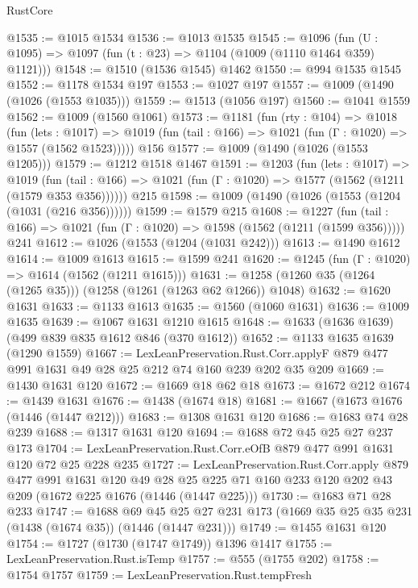 \begin{lexlean}{RustCore}
\begin{coremodule}
@1535 := @1015 @1534
@1536 := @1013 @1535
@1545 := @1096 (fun (U : @1095) => @1097 (fun (t : @23) => @1104 (@1009 (@1110 @1464 @359) @1121)))
@1548 := @1510 (@1536 @1545) @1462
@1550 := @994 @1535 @1545
@1552 := @1178 @1534 @197
@1553 := @1027 @197
@1557 := @1009 (@1490 (@1026 (@1553 @1035)))
@1559 := @1513 (@1056 @197)
@1560 := @1041 @1559
@1562 := @1009 (@1560 @1061)
@1573 := @1181
    (fun (rty : @104) =>
    @1018
      (fun (lets : @1017) =>
      @1019 (fun (tail : @166) => @1021 (fun (Γ : @1020) => @1557 (@1562 @1523)))))
    @156
@1577 := @1009 (@1490 (@1026 (@1553 @1205)))
@1579 := @1212 @1518 @1467
@1591 := @1203
    (fun (lets : @1017) =>
    @1019 (fun (tail : @166) => @1021 (fun (Γ : @1020) => @1577 (@1562 (@1211 (@1579 @353 @356))))))
    @215
@1598 := @1009 (@1490 (@1026 (@1553 (@1204 (@1031 (@216 @356))))))
@1599 := @1579 @215
@1608 := @1227
    (fun (tail : @166) => @1021 (fun (Γ : @1020) => @1598 (@1562 (@1211 (@1599 @356)))))
    @241
@1612 := @1026 (@1553 (@1204 (@1031 @242)))
@1613 := @1490 @1612
@1614 := @1009 @1613
@1615 := @1599 @241
@1620 := @1245 (fun (Γ : @1020) => @1614 (@1562 (@1211 @1615)))
@1631 := @1258 (@1260 @35 (@1264 (@1265 @35))) (@1258 (@1261 (@1263 @62 @1266)) @1048)
@1632 := @1620 @1631
@1633 := @1133 @1613
@1635 := @1560 (@1060 @1631)
@1636 := @1009 @1635
@1639 := @1067 @1631 @1210 @1615
@1648 := @1633 (@1636 @1639) (@499 @839 @835 @1612 @846 (@370 @1612))
@1652 := @1133 @1635 @1639 (@1290 @1559)
@1667 := LexLeanPreservation.Rust.Corr.applyF
    @879
    @477
    @991
    @1631
    @49
    @28
    @25
    @212
    @74
    @160
    @239
    @202
    @35
    @209
@1669 := @1430 @1631 @120
@1672 := @1669 @18 @62 @18
@1673 := @1672 @212
@1674 := @1439 @1631
@1676 := @1438 (@1674 @18)
@1681 := @1667 (@1673 @1676 (@1446 (@1447 @212)))
@1683 := @1308 @1631 @120
@1686 := @1683 @74 @28 @239
@1688 := @1317 @1631 @120
@1694 := @1688 @72 @45 @25 @27 @237 @173
@1704 := LexLeanPreservation.Rust.Corr.eOfB @879 @477 @991 @1631 @120 @72 @25 @228 @235
@1727 := LexLeanPreservation.Rust.Corr.apply
    @879
    @477
    @991
    @1631
    @120
    @49
    @28
    @25
    @225
    @71
    @160
    @233
    @120
    @202
    @43
    @209
    (@1672 @225 @1676 (@1446 (@1447 @225)))
@1730 := @1683 @71 @28 @233
@1747 := @1688
    @69
    @45
    @25
    @27
    @231
    @173
    (@1669 @35 @25 @35 @231 (@1438 (@1674 @35)) (@1446 (@1447 @231)))
@1749 := @1455 @1631 @120
@1754 := @1727 (@1730 (@1747 @1749)) @1396 @1417
@1755 := LexLeanPreservation.Rust.isTemp
@1757 := @555 (@1755 @202)
@1758 := @1754 @1757
@1759 := LexLeanPreservation.Rust.tempFresh

\end{coremodule}
\end{lexlean}
